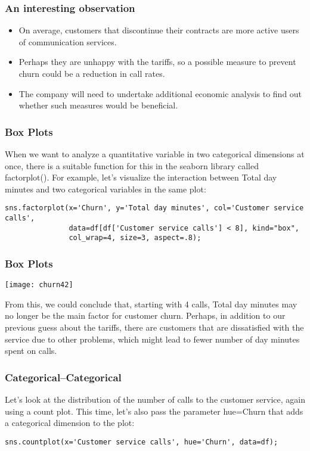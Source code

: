 \begin{frame}[fragile]\frametitle{An interesting observation}
\begin{itemize}
\item On average, customers that discontinue their contracts are more active users of communication services. 
\item Perhaps they are unhappy with the tariffs, so a possible measure to prevent churn could be a reduction in call rates. 
\item The company will need to undertake additional economic analysis to find out whether such measures would be beneficial.
\end{itemize}
\end{frame}

\begin{frame}[fragile]\frametitle{Box Plots}
When we want to analyze a quantitative variable in two categorical dimensions at once, there is a suitable function for this in the seaborn library called factorplot(). For example, let's visualize the interaction between Total day minutes and two categorical variables in the same plot:
 \begin{lstlisting}
sns.factorplot(x='Churn', y='Total day minutes', col='Customer service calls',
               data=df[df['Customer service calls'] < 8], kind="box",
               col_wrap=4, size=3, aspect=.8);
\end{lstlisting}
\end{frame}

\begin{frame}[fragile]\frametitle{Box Plots}
\begin{center}
\texttt{[image: churn42]}
\end{center}
From this, we could conclude that, starting with 4 calls, Total day minutes may no longer be the main factor for customer churn. Perhaps, in addition to our previous guess about the tariffs, there are customers that are dissatisfied with the service due to other problems, which might lead to fewer number of day minutes spent on calls.
\end{frame}

\begin{frame}[fragile]\frametitle{Categorical–Categorical}
Let's look at the distribution of the number of calls to the customer service, again using a count plot. This time, let's also pass the parameter hue=Churn that adds a categorical dimension to the plot:
 \begin{lstlisting}
sns.countplot(x='Customer service calls', hue='Churn', data=df);
\end{lstlisting}
\end{frame}

